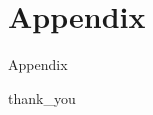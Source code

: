 \section{Appendix}

\begin{frame}{Appendix}

\end{frame}

{
{thank_you}
\begin{frame}[plain]
\end{frame}
}

